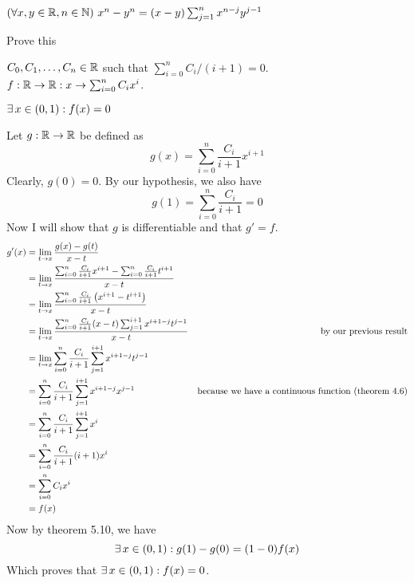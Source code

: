 \documentclass[11pt,letterpaper]{article}
\begin{document}
\begin{Problem}{5.4}
\begin{Claim} $\left( \forall x,y\in\mathbb{R},n\in\mathbb{N} \right) \, x^n-y^n = (x-y) \sum_{j=1}^n x^{n-j}y^{j-1}$ \end{Claim}
\begin{Todo} Prove this \end{Todo}
\begin{Hypothesis} $C_0,C_1,\ldots,C_n\in\mathbb{R}$ such that $\sum_{i=0}^n C_i/(i+1) =0$. \,\,$f:\mathbb{R}\rightarrow\mathbb{R}:x\rightarrow \sum_{i=0}^n C_ix^i$. \end{Hypothesis}
\begin{Claim} $\exists\, x\in(0,1) :f(x)=0$ \end{Claim}
\begin{Proof}
Let $g:\mathbb{R}\rightarrow\mathbb{R}$ be defined as
\[ g(x) = \sum_{i=0}^n \frac{C_i}{i+1}x^{i+1} \]
Clearly, $g(0)=0$. By our hypothesis, we also have
\[ g(1) = \sum_{i=0}^n \frac{C_i}{i+1} =0 \]
Now I will show that $g$ is differentiable and that $g' = f$.
\begin{align*}
    g'(x) &= \lim_{t \rightarrow x}\frac{g(x)-g(t)}{x-t} \\
    &= \lim_{t \rightarrow x}\frac{\sum_{i=0}^n \frac{C_i}{i+1}x^{i+1}-\sum_{i=0}^n \frac{C_i}{i+1}t^{i+1}}{x-t} \\
    &= \lim_{t \rightarrow x}\frac{\sum_{i=0}^n \frac{C_i}{i+1}\left( x^{i+1}-t^{i+1} \right)}{x-t} \\
    &= \lim_{t \rightarrow x}\frac{\sum_{i=0}^n \frac{C_i}{i+1}(x-t)\sum_{j=1}^{i+1}x^{i+1-j}t^{j-1}}{x-t} &\text{by our previous result} \\
    &= \lim_{t \rightarrow x}\sum_{i=0}^n \frac{C_i}{i+1}\sum_{j=1}^{i+1}x^{i+1-j}t^{j-1} \\
    &= \sum_{i=0}^n\frac{C_i}{i+1}\sum_{j=1}^{i+1}x^{i+1-j}x^{j-1} & \text{because we have a continuous function (theorem 4.6)}\\
    &= \sum_{i=0}^n\frac{C_i}{i+1}\sum_{j=1}^{i+1}x^i \\
    &= \sum_{i=0}^n\frac{C_i}{i+1}(i+1)x^i \\
    &= \sum_{i=0}^n C_i x^i \\
    &= f(x)
\end{align*}
Now by theorem 5.10, we have
\[ \exists\, x\in(0,1) : g(1)-g(0) = (1-0)f(x) \]
Which proves that $\exists\, x\in(0,1) : f(x)=0$.
\end{Proof}
\end{Problem}
\end{document}
